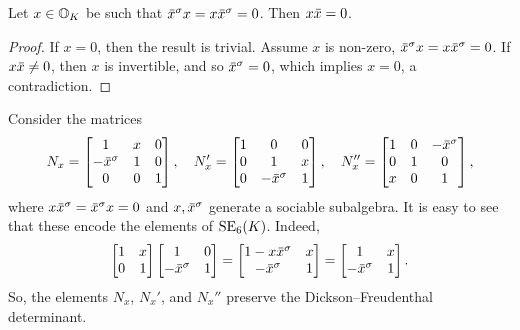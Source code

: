 \begin{lemma}
	\label{lemma:3_isotropic}
	Let $x \in \mathbb{O}_K$ be such that $\ovx^{\s} x = x \ovx^{\s} = 0$. Then $x\mathord{\mbox{\hspace*{0pt}}\,\overline{\!x\!\!\;}\!\:}\mbox{\hspace*{0pt}} = 0$.
\end{lemma}

\begin{proof}
	If $x = 0$, then the result is trivial. Assume $x$ is non-zero, $\ovx^{\s} x = x\ovx^{\s} = 0$.
	If $x \mathord{\mbox{\hspace*{0pt}}\,\overline{\!x\!\!\;}\!\:}\mbox{\hspace*{0pt}} \neq 0$, then $x$ is invertible, and so $\mathord{\mbox{\hspace*{0pt}}\,\overline{\!x\!\!\;}\!\:}\mbox{\hspace*{0pt}}^{\sigma} = 0$, which implies $x = 0$, a 
	contradiction.
\end{proof}

Consider the matrices
\begin{equation}
	N_x = \begin{bmatrix}
		1 & x & 0 \\
		-\ovx^{\s} & 1 & 0 \\
		0 & 0 & 1
	\end{bmatrix},\quad
	N_x' = \begin{bmatrix}
		1 & 0 & 0 \\
		0 & 1 & x \\
		0 & -\ovx^{\s} & 1
	\end{bmatrix},\quad
	N_x'' = \begin{bmatrix}
		1 & 0 & -\ovx^{\s} \\
		0 & 1 & 0 \\
		x & 0 & 1
	\end{bmatrix},
\end{equation}
where $x\ovx^{\s} = \ovx^{\s}x = 0$ and $x,\mathord{\mbox{\hspace*{0pt}}\,\overline{\!x\!\!\;}\!\:}\mbox{\hspace*{0pt}}^{\sigma}$ generate a sociable subalgebra. 
It is easy to see that these encode the elements of $\mathrm{SE}_6(K)$. Indeed,
\begin{equation}
	\begin{bmatrix}
		1 & x \\
		0 & 1
	\end{bmatrix}
	\begin{bmatrix}
		1 & 0 \\
		-\ovx ^{\s} & 1
	\end{bmatrix} = 
	\begin{bmatrix}
		1 - x\ovx ^{\s} & x \\
		-\ovx ^{\s} & 1 
	\end{bmatrix} = 
	\begin{bmatrix}
		1 & x \\
		-\ovx ^{\s} & 1
	\end{bmatrix}.
\end{equation}
So, the elements $N_x$, $N_x'$, and $N_x''$ preserve the Dickson--Freudenthal determinant. 
